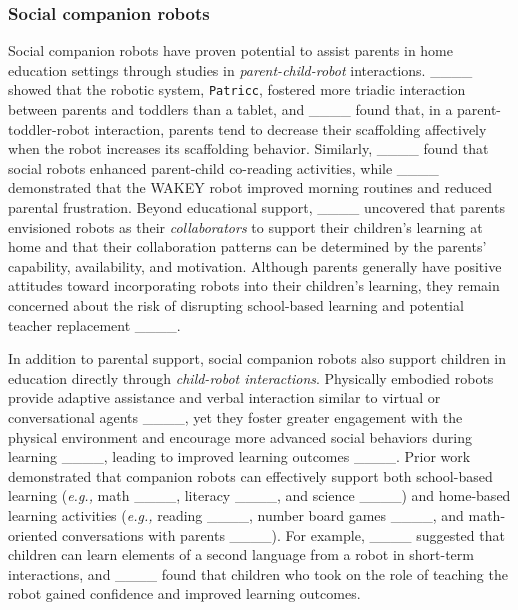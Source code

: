 \subsubsection{Social companion robots}
Social companion robots have proven potential to assist parents in home education settings through studies in \textit{parent-child-robot} interactions. ____ showed that the robotic system, \texttt{Patricc}, fostered more triadic interaction between parents and toddlers than a tablet, and ____ found that, in a parent-toddler-robot interaction, parents tend to decrease their scaffolding affectively when the robot increases its scaffolding behavior. Similarly, ____ found that social robots enhanced parent-child co-reading activities, while ____ demonstrated that the WAKEY robot improved morning routines and reduced parental frustration. Beyond educational support, ____ uncovered that parents envisioned robots as their \textit{collaborators} to support their children's learning at home and that their collaboration patterns can be determined by the parents' capability, availability, and motivation. Although parents generally have positive attitudes toward incorporating robots into their children's learning, they remain concerned about the risk of disrupting school-based learning and potential teacher replacement ____.

In addition to parental support, social companion robots also support children in education directly through \textit{child-robot interactions}. Physically embodied robots provide adaptive assistance and verbal interaction similar to virtual or conversational agents ____, yet they foster greater engagement with the physical environment and encourage more advanced social behaviors during learning ____, leading to improved learning outcomes ____. Prior work demonstrated that companion robots can effectively support both school-based learning (\textit{e.g.,} math ____, literacy ____, and science ____) and home-based learning activities (\textit{e.g.,} reading ____, number board games ____, and math-oriented conversations with parents ____). For example, ____ suggested that children can learn elements of a second language from a robot in short-term interactions, and ____ found that children who took on the role of teaching the robot gained confidence and improved learning outcomes.


